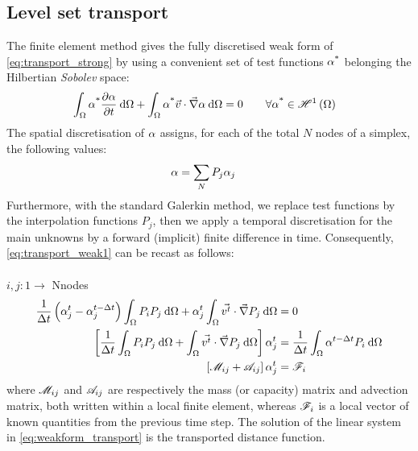 \subsection{Level set transport}
The finite element method gives the fully discretised weak form of \cref{eq:transport_strong} 
by using a convenient set of test functions $\alpha^\text{*}$ belonging the Hilbertian \emph{Sobolev} space:
\begin{align}
\label{eq:transport_weak1}
&  \int_{\Omega} \alpha^\text{*} \frac{\partial \alpha}{\partial t} \: \mathrm{d}\Omega 
+ \int_{\Omega} \alpha^\text{*} \vec{v} \cdot \vec{\nabla} \alpha\: \mathrm{d}\Omega 
= 0
\qquad \forall \alpha^\text{*} \in \mathscr{H}^1 \left( \Omega \right)   
\end{align}
The spatial discretisation of $\alpha$ assigns, for each of the total $N$ nodes of a simplex, the following values:
\begin{align}
\label{eq:transport_weak2}
&  \alpha = \sum_N  P_j \alpha_j
\end{align}
Furthermore, with the standard Galerkin method, we replace test functions by the interpolation functions $P_j$, 
then we apply a temporal discretisation for the main unknowns by a forward (implicit) finite difference in time.
Consequently, \cref{eq:transport_weak1} can be recast as follows:\\ \\
$i,j:1 \rightarrow$ Nnodes
\begin{subequations}
\begin{align}
\label{eq:transport_weak3}
 \frac{1}{\Delta t} \left( \alpha_j^t - \alpha_j^{t-\Delta t} \right)  \int_{\Omega} P_i P_j\: \mathrm{d}\Omega 
	+ \alpha_j^t   \int_{\Omega} \vec{v^t} \cdot \vec{\nabla} P_j \: \mathrm{d}\Omega &=  0 \\
\left[ \frac{1}{\Delta t} \int_{\Omega} P_i P_j \: \mathrm{d}\Omega + \int_{\Omega} \vec{v^t} \cdot \vec{\nabla} P_j \: \mathrm{d}\Omega \right] \alpha_j^t &= 
\frac{1}{\Delta t}  \int_{\Omega}  \alpha^{t-\Delta t} P_i \: \mathrm{d}\Omega \\
\label{eq:weakform_transport}
\left[ \mathscr{M}_{ij}+\mathscr{A}_{ij} \right] \alpha_j^t &= \mathscr{F}_{i}
\end{align}
\end{subequations}
where $\mathscr{M}_{ij}$ and $\mathscr{A}_{ij}$ are respectively the mass (or capacity) matrix and advection matrix, both written within a local 
finite element, whereas $\mathscr{F}_{i}$ is a local vector of known quantities from the previous time step. The solution of the linear
system in \cref{eq:weakform_transport} is the transported distance function.

